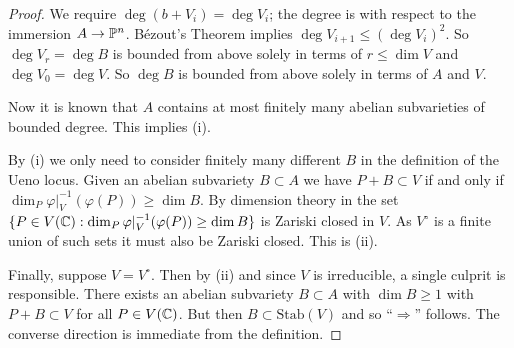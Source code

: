 \begin{proof}
  We  require $\deg(b+V_i)=\deg V_i$; the degree is with respect to the immersion
  $A\rightarrow{\mathbb{P}}^n$. 
  B\'ezout's Theorem implies $\deg V_{i+1} \le (\deg
  V_i)^2$. So $\deg V_r= \deg B$ is bounded from above solely in terms
  of $r\le \dim V$ and $\deg V_0=\deg V$. So $\deg B$ is bounded
  from above solely in terms of $A$ and $V$. 

  Now it is known that $A$ contains at most finitely many abelian
  subvarieties of bounded degree. This implies (i).

  By (i) we only need to consider finitely many different $B$ in the
  definition of the Ueno locus. Given an abelian subvariety $B\subset
  A$ we have $P+B\subset V$ if and only if $\dim_P
  \varphi|_V^{-1}(\varphi(P)) \ge \dim B$. By dimension theory in the
  set
  $\{ P \in V({\mathbb{C}}) : \dim_P
  \varphi|_V^{-1}(\varphi(P)) \ge \dim B\}$ is Zariski closed in $V$.
  As $V^{\circ}$ is a finite union of such sets it must also be
  Zariski closed. This is (ii).

  Finally, suppose $V=V^{\circ}$.  Then by (ii) and since $V$ is
  irreducible, a single culprit is responsible. There exists an
  abelian subvariety $B\subset A$ with $\dim B\ge 1$ with $P+B\subset
  V$ for all $P\in V({\mathbb{C}})$. But then $B\subset \mathrm{Stab}(V)$ and
  so ``$\Longrightarrow$'' follows. The converse direction is
  immediate from the definition. 
\end{proof}









  

